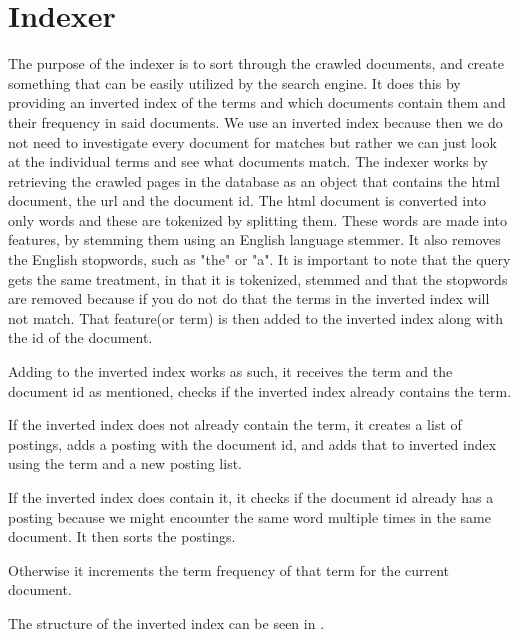 	\section{Indexer}
	The purpose of the indexer is to sort through the crawled documents, and create something that can be easily utilized by the search engine. It does this by providing an inverted index of the terms and which documents contain them and their frequency in said documents.
	We use an inverted index because then we do not need to investigate every document for matches but rather we can just look at the individual terms and see what documents match.
	The indexer works by retrieving the crawled pages in the database as an object that contains the html document, the url and the document id.
	The html document is converted into only words and these are tokenized by splitting them. 
	These words are made into features, by stemming them using an English language stemmer. It also removes the English stopwords, such as "the" or "a".
	It is important to note that the query gets the same treatment, in that it is tokenized, stemmed and that the stopwords are removed because if you do not do that the terms in the inverted index will not match.
	That feature(or term) is then added to the inverted index along with the id of the document.
	
	Adding to the inverted index works as such, it receives the term and the document id as mentioned, checks if the inverted index already contains the term.
	
	If the inverted index does not already contain the term, it creates a list of postings, adds a posting with the document id, and adds that to inverted index using the term and a new posting list.
	
	If the inverted index does contain it, it checks if the document id already has a posting because we might encounter the same word multiple times in the same document. It then sorts the postings.
	
	Otherwise it increments the term frequency of that term for the current document.
	
	The structure of the inverted index can be seen in .
	
